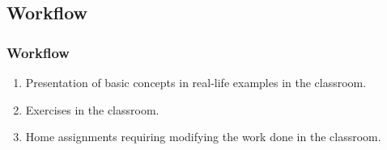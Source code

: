 \subsection[Workflow]{Workflow}
\begin{frame}
    \frametitle{Workflow}
    \begin{enumerate}
        \item Presentation of basic concepts in real-life examples in the classroom.
        \item Exercises in the classroom.
        \item Home assignments requiring modifying the work done in the classroom.
        \end{enumerate}
    \end{frame}

